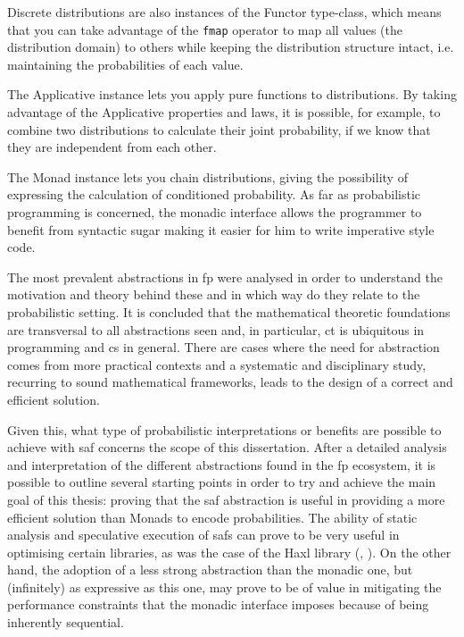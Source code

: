 \documentclass[
  oneside,
  11pt, a4paper,
  footinclude=true,
  headinclude=true,
  cleardoublepage=empty
]{scrbook}
\theoremstyle{definition}
\theoremstyle{definition}
\begin{document}
    Discrete distributions are also instances of the Functor type-class, which means that you can take advantage of the \texttt{fmap} operator to map all values (the distribution domain) to others while keeping the distribution structure intact, i.e. maintaining the probabilities of each value.
        
    The Applicative instance lets you apply pure functions to distributions. By taking advantage of the Applicative properties and laws, it is possible, for example, to combine two distributions to calculate their joint probability, if we know that they are independent from each other.
        
    The Monad instance lets you chain distributions, giving the possibility of expressing the calculation of conditioned probability. As far as probabilistic programming is concerned, the monadic interface allows the programmer to benefit from syntactic sugar making it easier for him to write imperative style code.
    
    The most prevalent abstractions in \gls{fp} were analysed in order to understand the motivation and theory behind these and in which way do they relate to the probabilistic setting. It is concluded that the mathematical theoretic foundations are transversal to all abstractions seen and, in particular, \gls{ct} is ubiquitous in programming and \gls{cs} in general. There are cases where the need for abstraction comes from more practical contexts and a systematic and disciplinary study, recurring to sound mathematical frameworks, leads to the design of a correct and efficient solution.
    
    Given this, what type of probabilistic interpretations or benefits are possible to achieve with \gls{saf} concerns the scope of this dissertation. After a detailed analysis and interpretation of the different abstractions found in the \gls{fp} ecosystem, it is possible to outline several starting points in order to try and achieve the main goal of this thesis: proving that the \gls{saf} abstraction is useful in providing a more efficient solution than Monads to encode probabilities. The ability of static analysis and speculative execution of \glspl{saf} can prove to be very useful in optimising certain libraries, as was the case of the Haxl library (\cite{Marlow:2014:NFA:2692915.2628144}, \cite{andrey2019selective}). On the other hand, the adoption of a less strong abstraction than the monadic one, but (infinitely) as expressive as this one, may prove to be of value in mitigating the performance constraints that the monadic interface imposes because of being inherently sequential.
    
\end{document}
